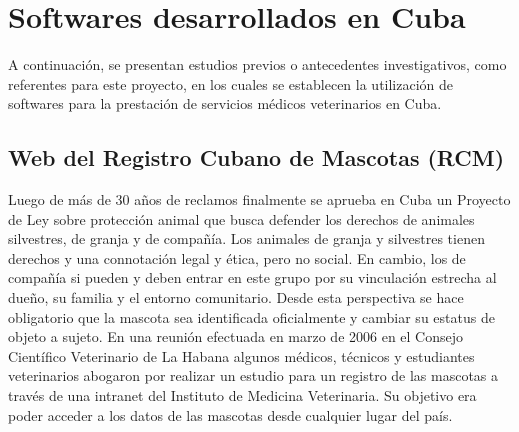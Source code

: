 \section{Softwares desarrollados en Cuba}
A continuación, se presentan estudios previos o antecedentes investigativos, como referentes para este proyecto, en los cuales se establecen la utilización de softwares para la prestación de servicios médicos veterinarios en Cuba. 

\subsection{Web del Registro Cubano de Mascotas (RCM)}\label{chapter:web}

%		

Luego de más de 30 años de reclamos finalmente se aprueba en Cuba un Proyecto de Ley sobre protección animal que busca defender los derechos de animales silvestres, de granja y de compañía. Los animales de granja y silvestres tienen derechos y una connotación legal y ética, pero no social. En cambio, los de compañía si pueden y deben entrar en este grupo por su vinculación estrecha al dueño, su familia y el entorno comunitario. Desde esta perspectiva se hace obligatorio que la mascota sea identificada oficialmente y cambiar su estatus de objeto a sujeto. En una reunión efectuada en marzo de 2006 en el Consejo Científico Veterinario de La Habana algunos médicos, técnicos y estudiantes veterinarios abogaron por realizar un estudio para un registro de las mascotas a través de una intranet del Instituto de Medicina Veterinaria. Su objetivo era poder acceder a los datos de las mascotas desde cualquier lugar del país.

